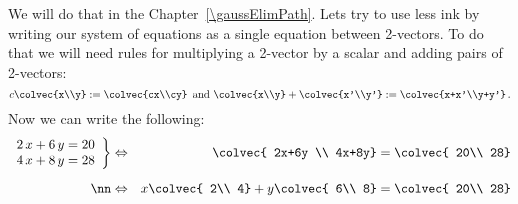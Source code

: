 %
We will do that in the Chapter~\ref{\gaussElimPath}. Lets try to use less ink by writing our system of  equations as a single equation between 2-vectors.
To do that we will need rules for multiplying a 2-vector by a scalar and adding pairs of 2-vectors:
\[
c\colvec{x\\y}:=\colvec{cx\\cy}\, \mbox{ and } \colvec{x\\y}+\colvec{x'\\y'}:=\colvec{x+x'\\y+y'}\, .
\]
Now we can write the following:
\begin{eqnarray*}
   \left.
\begin{array}{lr}
   	2\, x + 6\, y  =  20 \\
	4\, x + 8\, y  =  28
     \end{array}
   \right\} 
& \Leftrightarrow&    \colvec{ 2x+6y \\ 4x+8y}  =\colvec{ 20\\ 28}\\[2mm] \nn 
&\Leftrightarrow&
   x \colvec{ 2\\ 4} + y \colvec{ 6\\ 8} =\colvec{ 20\\ 28} 
\end{eqnarray*}
